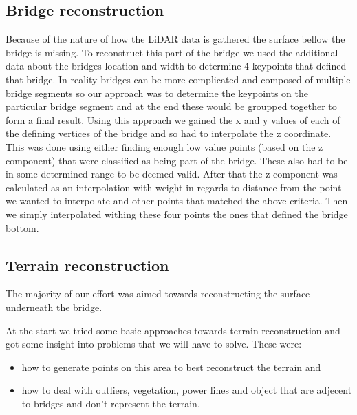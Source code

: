 \documentclass{egpubl-eurovis-star}
\begin{document}
\subsection{Bridge reconstruction}

Because of the nature of how the LiDAR data is gathered the surface bellow the bridge is missing.
To reconstruct this part of the bridge we used the additional data about the bridges location and width to determine 4 keypoints that defined that bridge.
In reality bridges can be more complicated and composed of multiple bridge segments so our approach was to determine the keypoints on the particular bridge segment and at the end these would be groupped together to form a final result.
Using this approach we gained the x and y values of each of the defining vertices of the bridge and so had to interpolate the z coordinate.
This was done using either finding enough low value points (based on the z component) that were classified as being part of the bridge.
These also had to be in some determined range to be deemed valid.
After that the z-component was calculated as an interpolation with weight in regards to distance from the point we wanted to interpolate and other points that matched the above criteria.
Then we simply interpolated withing these four points the ones that defined the bridge bottom.

\subsection{Terrain reconstruction}


The majority of our effort was aimed towards reconstructing the surface underneath the bridge.

At the start we tried some basic approaches towards terrain reconstruction and got some insight into problems that we will have to solve.
These were:
\begin{itemize}
\item{how to generate points on this area to best reconstruct the terrain and}
\item{how to deal with outliers, vegetation, power lines and object that are adjecent to bridges and don't represent the terrain.}
\end{itemize}
\end{document}
